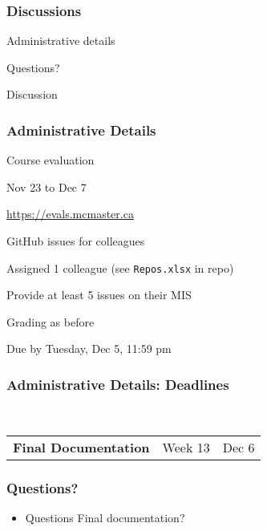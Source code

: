 \documentclass[t,12pt,numbers,fleqn]{beamer}
\begin{document}



\begin{frame}
\frametitle{Discussions}

\bi
\item Administrative details
\item Questions?
\item Discussion
\ei

\end{frame}


\begin{frame}
\frametitle{Administrative Details}

\bi
\item Course evaluation
\bi
\item Nov 23 to Dec 7
\item \url{https://evals.mcmaster.ca}
\ei
\item GitHub issues for colleagues
\bi
\item Assigned 1 colleague (see \texttt{Repos.xlsx} in repo)
\item Provide at least 5 issues on their MIS
\item Grading as before
\item Due by Tuesday, Dec 5, 11:59 pm
\ei
\ei

\end{frame}


\begin{frame}
\frametitle{Administrative Details: Deadlines}
~\newline
\begin{tabular}{l l l}
\textbf{Final Documentation} & Week 13 & Dec 6\\
\end {tabular}

\end{frame}


\begin{frame}
\frametitle{Questions?}
\begin{itemize}
\item Questions Final documentation?
\end{itemize}
\end{frame}
\end{document}
